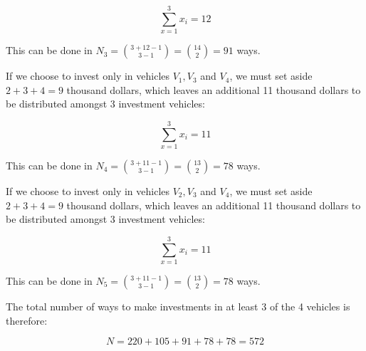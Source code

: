 \documentclass[a4paper,12pt]{article}
\begin{document}
\[ \sum_{x=1}^3 x_i = 12 \]

\noindent
This can be done in $N_3 = \binom{3+12-1}{3-1} = \binom{14}{2} = 91$ ways. 

If we choose to invest only in vehicles $V_1, V_3$ and $V_4$, we must set aside $2+3+4 = 9$ thousand dollars, which leaves an additional 11 thousand dollars to be distributed amongst 3 investment vehicles:

\[ \sum_{x=1}^3 x_i = 11 \]

\noindent
This can be done in $N_4 = \binom{3+11-1}{3-1} = \binom{13}{2} = 78$ ways.

If we choose to invest only in vehicles $V_2, V_3$ and $V_4$, we must set aside $2+3+4 = 9$ thousand dollars, which leaves an additional 11 thousand dollars to be distributed amongst 3 investment vehicles:

\[ \sum_{x=1}^3 x_i = 11 \]

\noindent
This can be done in $N_5 = \binom{3+11-1}{3-1} = \binom{13}{2} = 78$ ways. 

The total number of ways to make investments in at least 3 of the 4 vehicles is therefore:

\[ N = 220 + 105 + 91 + 78 + 78 = 572 \]
\end{document}
